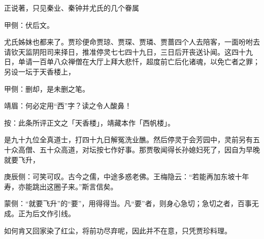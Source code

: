 \begin{parag}
    正说著，只见秦业、秦钟并尤氏的几个眷属\begin{note}甲侧：伏后文。\end{note}尤氏姊妹也都来了。贾珍便命贾琼、贾琛、贾璘、贾蔷四个人去陪客，一面吩咐去请钦天监阴阳司来择日，推准停灵七七四十九日，三日后开丧送讣闻。这四十九日，单请一百单八众禅僧在大厅上拜大悲忏，超度前亡后化诸魂，以免亡者之罪；另设一坛于天香楼上，\begin{note}甲侧：删却，是未删之笔。\end{note}\begin{note}靖眉：何必定用“西”字？读之令人酸鼻！\end{note}\begin{subnote}按：此条所评正文之「天香楼」，靖藏本作「西帆楼」。\end{subnote}是九十九位全真道士，打四十九日解冤洗业醮。然后停灵于会芳园中，灵前另有五十众高僧、五十众高道，对坛按七作好事。那贾敬闻得长孙媳妇死了，因自为早晚就要飞升，\begin{note}庚辰侧：可笑可叹。古今之儒，中途多惑老佛。王梅隐云：“若能再加东坡十年寿，亦能跳出这圈子来。”斯言信矣。\end{note}\begin{note}蒙侧：“就要飞升”的“要”，用得得当。凡“要”者，则身心急切；急切之者，百事无成。正为后文作引线。\end{note}如何肯又回家染了红尘，将前功尽弃呢，因此并不在意，只凭贾珍料理。
\end{parag}


